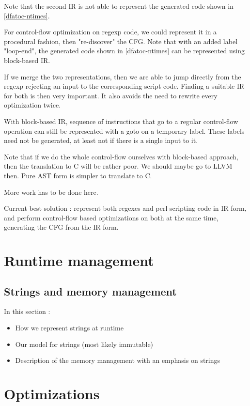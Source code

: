 \documentclass[11pt,a4paper]{report}
\begin{document}
Note that the second IR is not able to represent the generated code shown in \ref{dfatoc-ntimes}.

For control-flow optimization on regexp code, we could represent it in a procedural fashion, then "re-discover" the CFG. Note that with an added label "loop-end", the generated code shown in \ref{dfatoc-ntimes} can be represented using block-based IR.

If we merge the two representations, then we are able to jump directly from the regexp rejecting an input to the corresponding script code. Finding a suitable IR for both is then very important. It also avoids the need to rewrite every optimization twice.

With block-based IR, sequence of instructions that go to a regular control-flow operation can still be represented with a goto on a temporary label. These labels need not be generated, at least not if there is a single input to it.

Note that if we do the whole control-flow ourselves with block-based approach, then the translation to C will be rather poor. We should maybe go to LLVM then. Pure AST form is simpler to translate to C.

More work has to be done here.

Current best solution : represent both regexes and perl scripting code in IR form, and perform control-flow based optimizations on both at the same time, generating the CFG from the IR form.

\chapter{Runtime management}

\section{Strings and memory management}
\label{stringrep}

In this section :
\begin{itemize}
\item How we represent strings at runtime
\item Our model for strings (most likely immutable)
\item Description of the memory management with an emphasis on strings
\end{itemize}

\chapter{Optimizations}
\end{document}
